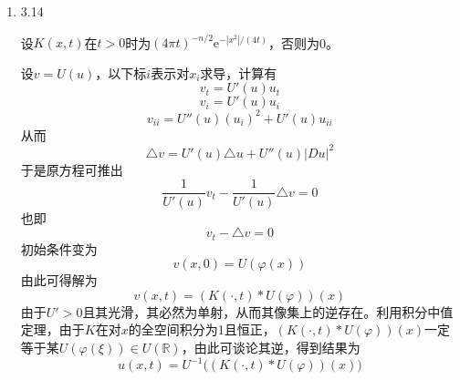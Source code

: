 \documentclass[a4paper,UTF8,fontset=windows,10pt]{ctexart}
\newcommand*{\er}{\mathrm{e}}
\begin{document}
\begin{enumerate}
    \item 3.14
    
    设$K(x,t)$在$t>0$时为$(4\pi t)^{-n/2}\er^{-|x^2|/(4t)}$，否则为0。
    
    设$v=U(u)$，以下标$i$表示对$x_i$求导，计算有
    $$v_t=U'(u)u_t$$
    $$v_i=U'(u)u_i$$
    $$v_{ii}=U''(u)(u_i)^2+U'(u)u_{ii}$$
    从而
    $$\triangle v=U'(u)\triangle u+U''(u)|Du|^2$$
    于是原方程可推出
    $$\frac{1}{U'(u)}v_t-\frac{1}{U'(u)}\triangle v=0$$
    也即
    $$v_t-\triangle v=0$$
    初始条件变为
    $$v(x,0)=U(\varphi(x))$$
    由此可得解为
    $$v(x,t)=(K(\cdot,t)*U(\varphi))(x)$$
    由于$U'>0$且其光滑，其必然为单射，从而其像集上的逆存在。利用积分中值定理，由于$K$在对$x$的全空间积分为1且恒正，$(K(\cdot,t)*U(\varphi))(x)$一定等于某$U(\varphi(\xi))\in U(\mathbb{R})$，由此可谈论其逆，得到结果为
    $$u(x,t)=U^{-1}\big((K(\cdot,t)*U(\varphi))(x)\big)$$
\end{enumerate}
\end{document}
